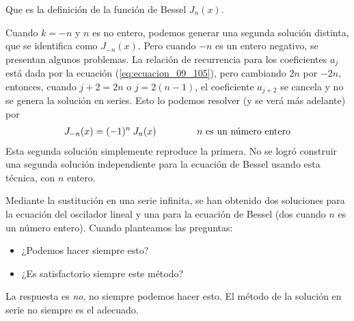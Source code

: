 Que es la definición de la función de Bessel $J_{n}(x)$.
\par
 Cuando $k = -n$ y $n$ es no entero, podemos generar una segunda solución distinta, que se identifica como $J_{-n}(x)$. Pero cuando $-n$ es un entero negativo, se presentan algunos problemas. La relación de recurrencia para los coeficientes $a_{j}$ está dada por la ecuación (\ref{eq:ecuacion_09_105}), pero cambiando $2n$ por $-2n$, entonces, cuando $j + 2 = 2 n$ o $j = 2 (n - 1)$, el coeficiente $a_{j+2}$ se cancela y no se genera la solución en series. Esto lo podemos resolver (y se verá más adelante) por
\begin{align}
J_{-n} (x) = (-1)^{n} \: J_{n}(x) \hspace{1.5cm} n \text{ es un número entero}
\label{eq:ecuacion_09_109}
\end{align}
Esta segunda solución simplemente reproduce la primera. No se logró construir una segunda solución independiente para la ecuación de Bessel usando esta técnica, con $n$ entero.
\par
Mediante la sustitución en una serie infinita, se han obtenido dos soluciones para la ecuación del oscilador lineal y una para la ecuación de Bessel (dos cuando $n$ es un número entero). Cuando planteamos las preguntas:
\begin{itemize}
\item ¿Podemos hacer siempre esto?
\item ¿Es satisfactorio siempre este método?
\end{itemize}
La respuesta es \emph{no}, no siempre podemos hacer esto. El método de la solución en serie no siempre es el adecuado.
